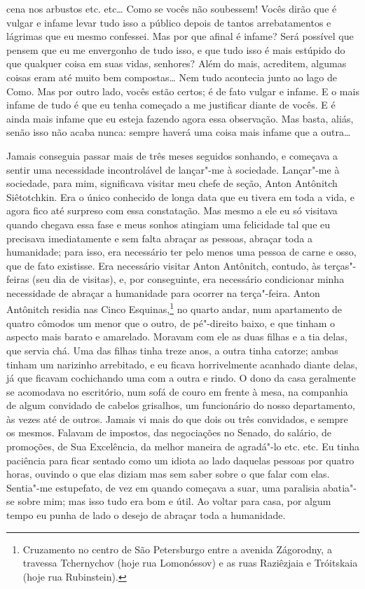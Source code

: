 cena nos arbustos etc. etc\ldots{} Como se vocês não soubessem! Vocês dirão
que é vulgar e infame levar tudo isso a público depois de tantos
arrebatamentos e lágrimas que eu mesmo confessei. Mas por que afinal é
infame? Será possível que pensem que eu me envergonho de tudo isso, e
que tudo isso é mais estúpido do que qualquer coisa em suas vidas,
senhores? Além do mais, acreditem, algumas coisas eram até muito bem
compostas\ldots{} Nem tudo acontecia junto ao lago de Como. Mas por outro
lado, vocês estão certos; é de fato vulgar e infame. E o mais infame de
tudo é que eu tenha começado a me justificar diante de vocês. E é ainda
mais infame que eu esteja fazendo agora essa observação. Mas basta,
aliás, senão isso não acaba nunca: sempre haverá uma coisa mais infame
que a outra\ldots{}

Jamais conseguia passar mais de três meses seguidos sonhando, e começava
a sentir uma necessidade incontrolável de lançar"-me à sociedade. Lançar"-me
à sociedade, para mim, significava visitar meu chefe de seção, Anton
Antônitch Siêtotchkin. Era o único conhecido de longa data que eu
tivera em toda a vida, e agora fico até surpreso com essa constatação.
Mas mesmo a ele eu só visitava quando chegava essa fase e meus sonhos
atingiam uma felicidade tal que eu precisava imediatamente e sem falta
abraçar as pessoas, abraçar toda a humanidade; para isso, era
necessário ter pelo menos uma pessoa de carne e osso, que de fato
existisse. Era necessário visitar Anton Antônitch, contudo, às
terças"-feiras (seu dia de visitas), e, por conseguinte, era necessário
condicionar minha necessidade de abraçar a humanidade para ocorrer na
terça"-feira. Anton Antônitch residia nas Cinco Esquinas,\footnote{
Cruzamento no centro de São Petersburgo entre a avenida Zágorodny, a
travessa Tchernychov (hoje rua Lomonóssov) e as ruas Raziêzjaia e
Tróitskaia (hoje rua Rubinstein).} no quarto andar, num apartamento de
quatro cômodos um menor que o outro, de pé"-direito baixo, e que tinham
o aspecto mais barato e amarelado. Moravam com ele as duas filhas e a
tia delas, que servia chá. Uma das filhas tinha treze anos, a outra
tinha catorze; ambas tinham um narizinho arrebitado, e eu ficava
horrivelmente acanhado diante delas, já que ficavam cochichando uma com
a outra e rindo. O dono da casa geralmente se acomodava no escritório,
num sofá de couro em frente à mesa, na companhia de algum convidado de
cabelos grisalhos, um funcionário do nosso departamento, às vezes até
de outros. Jamais vi mais do que dois ou três convidados, e sempre os
mesmos. Falavam de impostos, das negociações no Senado, do salário, de
promoções, de Sua Excelência, da melhor maneira de agradá"-lo etc. etc.
Eu tinha paciência para ficar sentado como um idiota ao lado daquelas
pessoas por quatro horas, ouvindo o que elas diziam mas sem saber sobre
o que falar com elas. Sentia"-me estupefato, de vez em quando começava a
suar, uma paralisia abatia"-se sobre mim; mas isso tudo era bom e útil.
Ao voltar para casa, por algum tempo eu punha de lado o desejo de
abraçar toda a humanidade.

